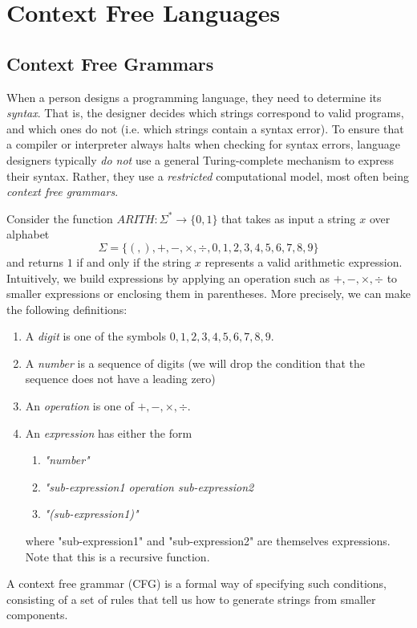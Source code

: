 \section{Context Free Languages}

\subsection{Context Free Grammars}

  When a person designs a programming language, they need to determine its \textit{syntax}. That is, the designer decides which strings correspond to valid programs, and which ones do not (i.e. which strings contain a syntax error). To ensure that a compiler or interpreter always halts when checking for syntax errors, language designers typically \textit{do not} use a general Turing-complete mechanism to express their syntax. Rather, they use a \textit{restricted} computational model, most often being \textit{context free grammars}. 
	
	\begin{example}
	  \label{ex:arithmetic-function}
		Consider the function $ARITH: \Sigma^* \to \{0,1\}$ that takes as input a string $x$ over alphabet 
		\begin{equation}
		  \Sigma = \{(, ), +, -, \times, \div, 0, 1, 2, 3, 4, 5, 6, 7, 8, 9\}
		\end{equation}
		and returns $1$ if and only if the string $x$ represents a valid arithmetic expression. Intuitively, we build expressions by applying an operation such as $+, -, \times, \div$ to smaller expressions or enclosing them in parentheses. More precisely, we can make the following definitions: 
		\begin{enumerate}
			\item A \textit{digit} is one of the symbols $0, 1, 2, 3, 4, 5, 6, 7, 8, 9$. 
			\item A \textit{number} is a sequence of digits (we will drop the condition that the sequence does not have a leading zero)
			\item An \textit{operation} is one of $+, -, \times, \div$. 
			\item An \textit{expression} has either the form 
			\begin{enumerate}
				\item \textit{"number"}
				\item \textit{"sub-expression1 operation sub-expression2}
				\item \textit{"(sub-expression1)"}
			\end{enumerate}
			where "sub-expression1" and "sub-expression2" are themselves expressions. Note that this is a recursive function. 
		\end{enumerate}
		A context free grammar (CFG) is a formal way of specifying such conditions, consisting of a set of rules that tell us how to generate strings from smaller components. 
	\end{example}

